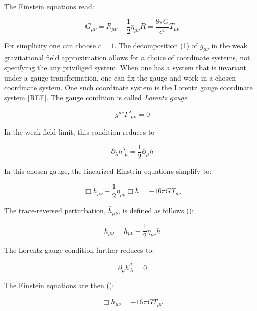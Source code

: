 \documentclass[epsf]{article}
\begin{document}
The Einstein equations read:

\begin{equation}
\boxed{G_{\mu\nu} = R_{\mu\nu} - \frac{1}{2} \eta_{\mu\nu} R = \frac {8 \pi G}{c^4} T_{\mu\nu}}
\label{eqn:einsteinequation}
\end{equation} 

For simplicity one can choose $c=1$. The decomposition (1) of $g_{\mu\nu}$ 
in the weak gravitational field approximation allows for a choice of coordinate systems, not specifying the 
any priviliged system. When one has a system that is invariant
under a gauge transformation, one can fix the gauge and work in a chosen 
coordinate system. One such coordinate system is the Lorentz gauge coordinate system [REF]. 
The gauge condition is called {\it Lorentz gauge}:

\begin{equation}
g^{\mu\nu}\Gamma^{\lambda}_{~~\mu\nu} = 0 
\end{equation}

In the weak field limit, this condition reduces to 

\begin{equation}
\partial_{\lambda} h^{\lambda}_{~~\mu} = \frac{1}{2}\partial_{\mu} h
\end{equation}

In this chosen gauge, the linearized Einstein equations simplify to:

\begin{equation}
\Box h_{\mu\nu} - \frac{1}{2} \eta_{\mu\nu}\Box h = - 16 \pi G T_{\mu\nu}
\end{equation}

The trace-reversed perturbation, $\bar{h}_{\mu\nu}$, is defined as follows (\cite{schutz,maggiore,chaky}):

\begin{equation}
\bar{h}_{\mu\nu} = h_{\mu\nu} - \frac{1}{2}\eta_{\mu\nu} h
\end{equation}

The Lorentz gauge condition further reduces to:

\begin{equation}
\partial_{\mu} \bar{h}^{\mu}_{~\lambda} = 0
\end{equation}

The Einstein equations are then (\cite{schutz,maggiore}):

\begin{equation}
\Box \bar{h}_{\mu\nu} = - 16 \pi G T_{\mu\nu}
\end{equation}
\end{document}
